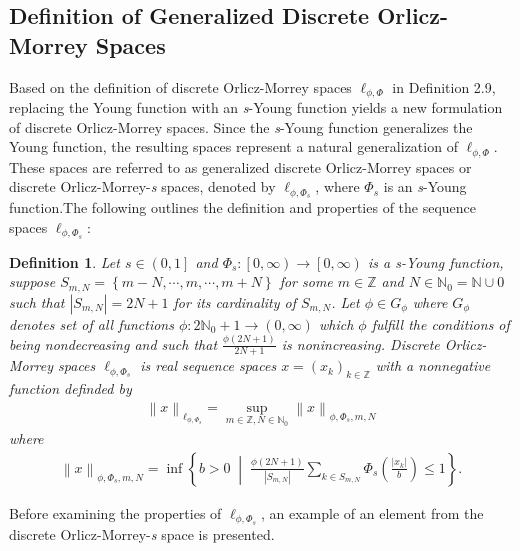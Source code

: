 \documentclass[12pt,a4paper]{article}
\newtheorem{definition}{Definition}[section]
\theoremstyle{remark}
\begin{document}
\subsection{Definition of Generalized Discrete Orlicz-Morrey Spaces}
Based on the definition of discrete Orlicz-Morrey spaces $\ell_{\phi,\Phi}$ in Definition 2.9, replacing the Young function with an \emph{s}-Young function yields a new formulation of discrete Orlicz-Morrey spaces. Since the \emph{s}-Young function generalizes the Young function, the resulting spaces represent a natural generalization of $\ell_{\phi,\Phi}$. These spaces are referred to as generalized discrete Orlicz-Morrey spaces or discrete Orlicz-Morrey-\emph{s} spaces, denoted by $\ell_{\phi,\Phi_s}$, where $\Phi_s$ is an \emph{s}-Young function.The following outlines the definition and properties of the sequence spaces $\ell_{\phi,\Phi_s}$:
\begin{definition}
    Let $s\in\left(0,1\right]$ and $\Phi_s : \left[0, \infty\right) \rightarrow \left[0, \infty\right)$ is a \emph{s}-Young function, suppose $S_{m,N}=\left\{m-N,\cdots,m,\cdots,m+N\right\}$ for some $m\in\mathbb{Z}$ and $N\in\mathbb{N}_0=\mathbb{N}\cup 0$ such that $\left|S_{m,N}\right|=2N+1$ for its cardinality of $S_{m,N}$. Let $\phi\in G_\phi$ where $G_\phi$ denotes set of all functions $\phi : 2\mathbb{N}_0 +1 \rightarrow (0, \infty)$ which $\phi$ fulfill the conditions of being nondecreasing and such that $\frac{\phi\left(2N+1\right)}{2N+1}$ is nonincreasing. Discrete Orlicz-Morrey spaces $\ell_{\phi,\Phi_s}$ is real sequence spaces $x=\left(x_k\right)_{k\in\mathbb{Z}}$ with a nonnegative function definded by 
    \begin{eqnarray*}
        \left\lVert x\right\rVert _{\ell_{\phi,\Phi_s}} =\sup_{m\in\mathbb{Z}, N\in\mathbb{N}_0} \left\lVert x\right\rVert _{\phi,\Phi_s, m, N}
    \end{eqnarray*}
    where
    \begin{eqnarray*}
        \left\lVert x\right\rVert _{\phi,\Phi_s, m, N} = \inf \left\{b>0 \;\middle|\; \frac{\phi\left(2N+1\right)}{\left|S_{m,N}\right|}\sum_{k\in S_{m,N}}\Phi_s\left(\frac{\left|x_k\right|}{b}\right) \leq 1\right\}.
    \end{eqnarray*}
\end{definition}

Before examining the properties of $\ell_{\phi,\Phi_s}$, an example of an element from the discrete Orlicz-Morrey-\emph{s} space is presented. 
\end{document}
